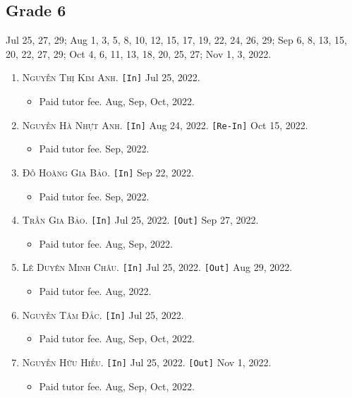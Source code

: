 \documentclass{article}
\numberwithin{equation}{section}
\begin{document}
\subsection{Grade 6}
Jul 25, 27, 29; Aug 1, 3, 5, 8, 10, 12, 15, 17, 19, 22, 24, 26, 29; Sep 6, 8, 13, 15, 20, 22, 27, 29; Oct 4, 6, 11, 13, 18, 20, 25, 27; Nov 1, 3, 2022.
\begin{enumerate}
	\item \textsc{Nguyễn Thị Kim Anh.} \texttt{[In]} Jul 25, 2022.
	\begin{itemize}
		\item \textsf{Paid tutor fee.} Aug, Sep, Oct, 2022.
	\end{itemize}
	\item \textsc{Nguyễn Hà Nhựt Anh.} \texttt{[In]} Aug 24, 2022. \texttt{[Re-In]} Oct 15, 2022.
	\begin{itemize}
		\item \textsf{Paid tutor fee.} Sep, 2022.
	\end{itemize}
	\item \textsc{Đỗ Hoàng Gia Bảo.} \texttt{[In]} Sep 22, 2022.
	\begin{itemize}
		\item \textsf{Paid tutor fee.} Sep, 2022.
	\end{itemize}
	\item \textsc{Trần Gia Bảo.} \texttt{[In]} Jul 25, 2022. \texttt{[Out]} Sep 27, 2022.
	\begin{itemize}
		\item \textsf{Paid tutor fee.} Aug, Sep, 2022.
	\end{itemize}
	\item \textsc{Lê Duyên Minh Châu.} \texttt{[In]} Jul 25, 2022. \texttt{[Out]} Aug 29, 2022.
	\begin{itemize}
		\item \textsf{Paid tutor fee.} Aug, 2022.
	\end{itemize}
	\item \textsc{Nguyễn Tâm Đắc.} \texttt{[In]} Jul 25, 2022.
	\begin{itemize}
		\item \textsf{Paid tutor fee.} Aug, Sep, Oct, 2022.
	\end{itemize}
	\item \textsc{Nguyễn Hữu Hiếu.} \texttt{[In]} Jul 25, 2022. \texttt{[Out]} Nov 1, 2022.
	\begin{itemize}
		\item \textsf{Paid tutor fee.} Aug, Sep, Oct, 2022.
	\end{itemize}

\end{enumerate}
\end{document}
